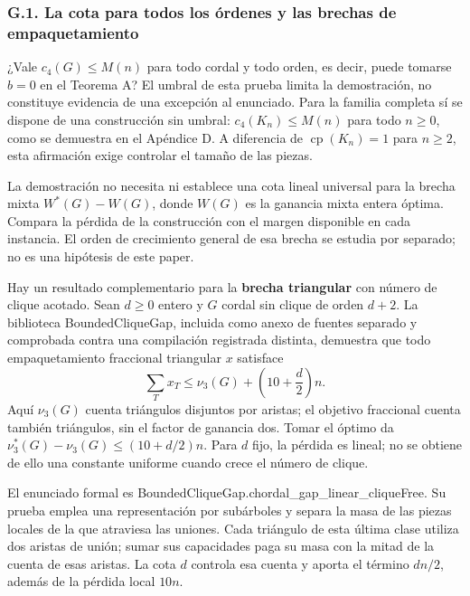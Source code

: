 \documentclass[spanish,11pt,a4paper]{article}
\begin{document}
\subsubsection{G.1. La cota para todos los órdenes y las brechas de empaquetamiento}\label{g.1.-la-cota-para-todos-los-ordenes-y-las-brechas-de-empaquetamiento}

¿Vale \(c_4(G)\le M(n)\) para todo cordal y todo orden, es decir, puede tomarse \(b=0\) en el Teorema A? El umbral de esta prueba limita la demostración, no constituye evidencia de una excepción al enunciado. Para la familia completa sí se dispone de una construcción sin umbral: \(c_4(K_n)\le M(n)\) para todo \(n\ge0\), como se demuestra en el Apéndice D. A diferencia de \(\operatorname{cp}(K_n)=1\) para \(n\ge2\), esta afirmación exige controlar el tamaño de las piezas.

La demostración no necesita ni establece una cota lineal universal para la brecha mixta \(W^*(G)-W(G)\), donde \(W(G)\) es la ganancia mixta entera óptima. Compara la pérdida de la construcción con el margen disponible en cada instancia. El orden de crecimiento general de esa brecha se estudia por separado; no es una hipótesis de este paper.

Hay un resultado complementario para la \textbf{brecha triangular} con número de clique acotado. Sean \(d\ge0\) entero y \(G\) cordal sin clique de orden \(d+2\). La biblioteca {\ttfamily\small BoundedCliqu\discretionary{\hbox{\ensuremath{\hookrightarrow}}}{}{}eGap}, incluida como anexo de fuentes separado y comprobada contra una compilación registrada distinta, demuestra que todo empaquetamiento fraccional triangular \(x\) satisface \[
\sum_T x_T\le \nu_3(G)+\left(10+\frac d2\right)n.
\tag{G.1}
\] Aquí \(\nu_3(G)\) cuenta triángulos disjuntos por aristas; el objetivo fraccional cuenta también triángulos, sin el factor de ganancia dos. Tomar el óptimo da \(\nu_3^*(G)-\nu_3(G)\le(10+d/2)n\). Para \(d\) fijo, la pérdida es lineal; no se obtiene de ello una constante uniforme cuando crece el número de clique.

El enunciado formal es {\ttfamily\small BoundedCliqu\discretionary{\hbox{\ensuremath{\hookrightarrow}}}{}{}eGap.\discretionary{\hbox{\ensuremath{\hookrightarrow}}}{}{}chordal\_\discretionary{\hbox{\ensuremath{\hookrightarrow}}}{}{}gap\_\discretionary{\hbox{\ensuremath{\hookrightarrow}}}{}{}linear\_\discretionary{\hbox{\ensuremath{\hookrightarrow}}}{}{}cliqueFree}. Su prueba emplea una representación por subárboles y separa la masa de las piezas locales de la que atraviesa las uniones. Cada triángulo de esta última clase utiliza dos aristas de unión; sumar sus capacidades paga su masa con la mitad de la cuenta de esas aristas. La cota \(d\) controla esa cuenta y aporta el término \(dn/2\), además de la pérdida local \(10n\).
\end{document}
